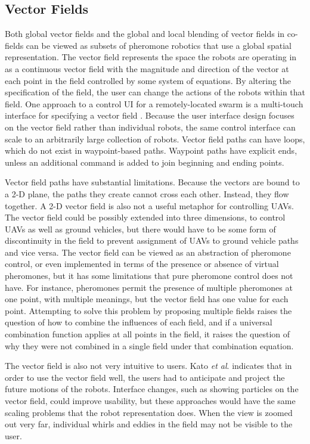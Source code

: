 \subsection{Vector Fields} \label{section:Vector_Fields}
Both global vector fields and the global and local blending of vector fields in co-fields can be viewed as subsets of pheromone robotics that use a global spatial representation. 
The vector field represents the space the robots are operating in as a continuous vector field with the magnitude and direction of the vector at each point in the field controlled by some system of equations.
By altering the specification of the field, the user can change the actions of the robots within that field. 
One approach to a control UI for a remotely-located swarm is a multi-touch interface for specifying a vector field \citep{Kato:2009:MIC:1520340.1520500}.
Because the user interface design focuses on the vector field rather than individual robots, the same control interface can scale to an arbitrarily large collection of robots. 
Vector field paths can have loops, which do not exist in waypoint-based paths. 
Waypoint paths have explicit ends, unless an additional command is added to join beginning and ending points. 

Vector field paths have substantial limitations. 
Because the vectors are bound to a 2-D plane, the paths they create cannot cross each other. 
Instead, they flow together. 
A 2-D vector field is also not a useful metaphor for controlling UAVs.
The vector field could be possibly extended into three dimensions, to control UAVs as well as ground vehicles, but there would have to be some form of discontinuity in the field to prevent assignment of UAVs to ground vehicle paths and vice versa. 
The vector field can be viewed as an abstraction of pheromone control, or even implemented in terms of the presence or absence of virtual pheromones, but it has some limitations that pure pheromone control does not have.
For instance, pheromones permit the presence of multiple pheromones at one point, with multiple meanings, but the vector field has one value for each point. 
Attempting to solve this problem by proposing multiple fields raises the question of how to combine the influences of each field, and if a universal combination function applies at all points in the field, it raises the question of why they were not combined in a single field under that combination equation. 

The vector field is also not very intuitive to users. 
Kato \emph{et al}. indicates that in order to use the vector field well, the users had to anticipate and project the future motions of the robots. 
Interface changes, such as showing particles on the vector field, could improve usability, but these approaches would have the same scaling problems that the robot representation does. 
When the view is zoomed out very far, individual whirls and eddies in the field may not be visible to the user. 

